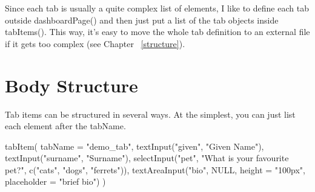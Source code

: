 \documentclass[
]{book}
\newenvironment{Shaded}{\begin{snugshade}}{\end{snugshade}}
\newcommand{\AttributeTok}[1]{\textcolor[rgb]{0.77,0.63,0.00}{#1}}
\newcommand{\CommentTok}[1]{\textcolor[rgb]{0.56,0.35,0.01}{\textit{#1}}}
\newcommand{\ConstantTok}[1]{\textcolor[rgb]{0.00,0.00,0.00}{#1}}
\newcommand{\FunctionTok}[1]{\textcolor[rgb]{0.00,0.00,0.00}{#1}}
\newcommand{\NormalTok}[1]{#1}
\newcommand{\SpecialCharTok}[1]{\textcolor[rgb]{0.00,0.00,0.00}{#1}}
\newcommand{\StringTok}[1]{\textcolor[rgb]{0.31,0.60,0.02}{#1}}
\begin{document}
\begin{Shaded}
\end{Shaded}

Since each tab is usually a quite complex list of elements, I like to define each tab outside dashboardPage() and then just put a list of the tab objects inside tabItems(). This way, it's easy to move the whole tab definition to an external file if it gets too complex (see Chapter ~\ref{structure}).

\hypertarget{body-structure}{%
\section{Body Structure}\label{body-structure}}

Tab items can be structured in several ways. At the simplest, you can just list each element after the tabName.

\begin{Shaded}
\begin{Highlighting}[]
\FunctionTok{tabItem}\NormalTok{(}
    \AttributeTok{tabName =} \StringTok{"demo\_tab"}\NormalTok{,}
    \FunctionTok{textInput}\NormalTok{(}\StringTok{"given"}\NormalTok{, }\StringTok{"Given Name"}\NormalTok{),}
    \FunctionTok{textInput}\NormalTok{(}\StringTok{"surname"}\NormalTok{, }\StringTok{"Surname"}\NormalTok{),}
    \FunctionTok{selectInput}\NormalTok{(}\StringTok{"pet"}\NormalTok{, }\StringTok{"What is your favourite pet?"}\NormalTok{, }\FunctionTok{c}\NormalTok{(}\StringTok{"cats"}\NormalTok{, }\StringTok{"dogs"}\NormalTok{, }\StringTok{"ferrets"}\NormalTok{)),}
    \FunctionTok{textAreaInput}\NormalTok{(}\StringTok{"bio"}\NormalTok{, }\ConstantTok{NULL}\NormalTok{, }\AttributeTok{height =} \StringTok{"100px"}\NormalTok{, }\AttributeTok{placeholder =} \StringTok{"brief bio"}\NormalTok{)}
\NormalTok{)}
\end{Highlighting}
\end{Shaded}
\end{document}
